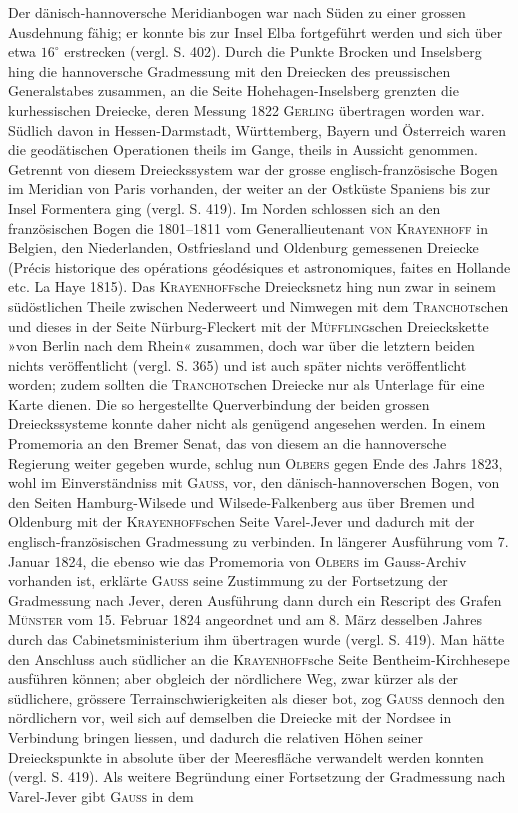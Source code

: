 \par\noindent\hspace*{\parindent}Der dänisch-hannoversche Meridianbogen war nach Süden zu einer grossen Ausdehnung fähig; er konnte bis zur Insel Elba fortgeführt werden und sich über etwa $16^\circ$ erstrecken (vergl. S. 402). Durch die Punkte Brocken und Inselsberg hing die hannoversche Gradmessung mit den Dreiecken des preussischen Generalstabes zusammen, an die Seite Hohehagen-Inselsberg grenzten die kurhessischen Dreiecke, deren Messung 1822 \textsc{Gerling} übertragen worden war. Südlich davon in Hessen-Darmstadt, Württemberg, Bayern und Österreich waren die geodätischen Operationen theils im Gange, theils in Aussicht genommen. Getrennt von diesem Dreieckssystem war der grosse englisch-französische Bogen im Meridian von Paris vorhanden, der weiter an der Ostküste Spaniens bis zur Insel Formentera ging (vergl. S. 419). Im Norden schlossen sich an den französischen Bogen die 1801--1811 vom Generallieutenant \textsc{von Krayenhoff} in Belgien, den Niederlanden, Ostfriesland und Oldenburg gemessenen Dreiecke (Précis historique des opérations géodésiques et astronomiques, faites en Hollande etc. La Haye 1815). Das \textsc{Krayenhoff}sche Dreiecksnetz hing nun zwar in seinem südöstlichen Theile zwischen Nederweert und Nimwegen mit dem \textsc{Tranchot}schen und dieses in der Seite Nürburg-Fleckert mit der \textsc{Müffling}schen Dreieckskette »von Berlin nach dem Rhein« zusammen, doch war über die letztern beiden nichts veröffentlicht (vergl. S. 365) und ist auch später nichts veröffentlicht worden; zudem sollten die \textsc{Tranchot}schen Dreiecke nur als Unterlage für eine Karte dienen. Die so hergestellte Querverbindung der beiden grossen Dreieckssysteme konnte daher nicht als genügend angesehen werden. In einem Promemoria an den Bremer Senat, das von diesem an die hannoversche Regierung weiter gegeben wurde, schlug nun \textsc{Olbers} gegen Ende des Jahrs 1823, wohl im Einverständniss mit \textsc{Gauss}, vor, den dänisch-hannoverschen Bogen, von den Seiten Hamburg-Wilsede und Wilsede-Falkenberg aus über Bremen und Oldenburg mit der \textsc{Krayenhoff}schen Seite Varel-Jever und dadurch mit der englisch-französischen Gradmessung zu verbinden. In längerer Ausführung vom 7. Januar 1824, die ebenso wie das Promemoria von \textsc{Olbers} im Gauss-Archiv vorhanden ist, erklärte \textsc{Gauss} seine Zustimmung zu der Fortsetzung der Gradmessung nach Jever, deren Ausführung dann durch ein Rescript des Grafen \textsc{Münster} vom 15. Februar 1824 angeordnet und am 8. März desselben Jahres durch das Cabinetsministerium ihm übertragen wurde (vergl. S. 419). Man hätte den Anschluss auch südlicher an die \textsc{Krayenhoff}sche Seite Bentheim-Kirchhesepe ausführen können; aber obgleich der nördlichere Weg, zwar kürzer als der südlichere, grössere Terrainschwierigkeiten als dieser bot, zog \textsc{Gauss} dennoch den nördlichern vor, weil sich auf demselben die Dreiecke mit der Nordsee in Verbindung bringen liessen, und dadurch die relativen Höhen seiner Dreieckspunkte in absolute über der Meeresfläche verwandelt werden konnten (vergl. S. 419). Als weitere Begründung einer Fortsetzung der Gradmessung nach Varel-Jever gibt \textsc{Gauss} in dem
